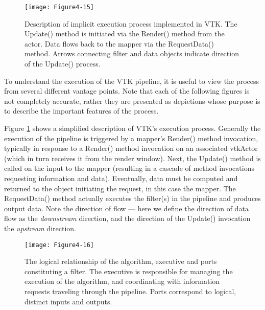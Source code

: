\begin{figure}[!htb]
  \centering
  \texttt{[image: Figure4-15]}\\
  \caption{Description of implicit execution process implemented in VTK. The Update() method is initiated via the Render() method from the actor. Data flows back to the mapper via the RequestData() method. Arrows connecting filter and data objects indicate direction of the Update() process.}\label{fig:Figure4-15}
\end{figure}

To understand the execution of the VTK pipeline, it is useful to view the process from several different vantage points. Note that each of the following figures is not completely accurate, rather they are presented as depictions whose purpose is to describe the important features of the process.

Figure \ref{fig:Figure4-15} shows a simplified description of VTK's execution process. Generally the execution of the pipeline is triggered by a mapper's Render() method invocation, typically in response to a Render() method invocation on an associated vtkActor (which in turn receives it from the render window). Next, the Update() method is called on the input to the mapper (resulting in a cascade of method invocations requesting information and data). Eventually, data must be computed and returned to the object initiating the request, in this case the mapper. The RequestData() method actually executes the filter(s) in the pipeline and produces output data. Note the direction of flow --- here we define the direction of data flow as the \emph{downstream} direction, and the direction of the Update() invocation the \emph{upstream} direction.

\begin{figure}[!htb]
  \centering
  \texttt{[image: Figure4-16]}\\
  \caption{The logical relationship of the algorithm, executive and ports constituting a filter. The executive is responsible for managing the execution of the algorithm, and coordinating with information requests traveling through the pipeline. Ports correspond to logical, distinct inputs and outputs.}\label{fig:Figure4-16}
\end{figure}

